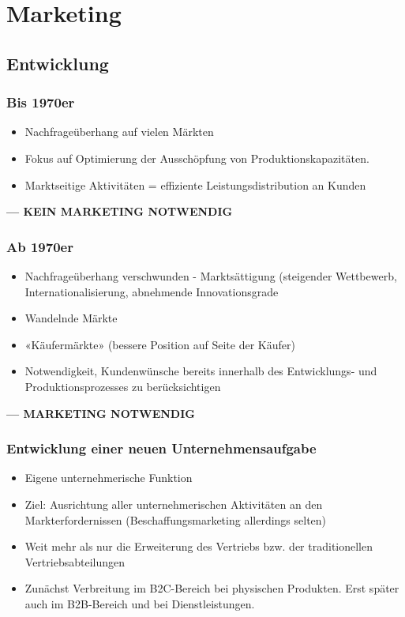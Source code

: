 \section{Marketing}
\subsection{Entwicklung}
\subsubsection{Bis 1970er}
\begin{itemize}
	\item Nachfrageüberhang auf vielen Märkten
	\item Fokus auf Optimierung der Ausschöpfung von Produktionskapazitäten.
	\item Marktseitige Aktivitäten = effiziente Leistungsdistribution an Kunden
\end{itemize}
\textbf{--- KEIN MARKETING NOTWENDIG}

\subsubsection{Ab 1970er}
\begin{itemize}
	\item Nachfrageüberhang verschwunden - Marktsättigung (steigender Wettbewerb, Internationalisierung, abnehmende Innovationsgrade
	\item Wandelnde Märkte
	\item «Käufermärkte» (bessere Position auf Seite der Käufer)
	\item Notwendigkeit, Kundenwünsche bereits innerhalb des Entwicklungs- und Produktionsprozesses zu berücksichtigen
\end{itemize}
\textbf{--- MARKETING NOTWENDIG}

\subsubsection{Entwicklung einer neuen Unternehmensaufgabe}
\begin{itemize}
	\item Eigene unternehmerische Funktion
	\item Ziel: Ausrichtung aller unternehmerischen Aktivitäten an den Markterfordernissen (Beschaffungsmarketing allerdings selten)
	\item Weit mehr als nur die Erweiterung des Vertriebs bzw. der traditionellen Vertriebsabteilungen
	\item Zunächst Verbreitung im B2C-Bereich bei physischen Produkten. Erst später auch im B2B-Bereich und bei Dienstleistungen.
\end{itemize}

